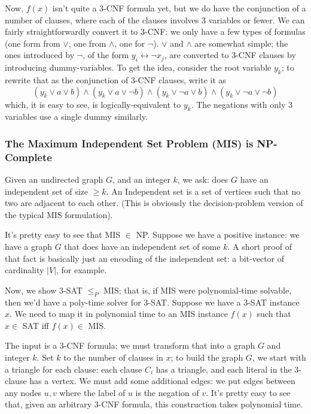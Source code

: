 \documentclass{article}
\begin{document}
Now, $f(x)$ isn't quite a 3-CNF formula yet, but we do have the conjunction of
a number of clauses, where each of the clauses involves 3 variables or
fewer. We can fairly straightforwardly convert it to 3-CNF: we only have
a few types of formulas (one form from $\vee$, one from $\wedge$, one
for $\neg$).
$\vee$ and $\wedge$ are somewhat simple; the ones introduced by $\neg$,
of the form $y_i \leftrightarrow \neg x_j$, are converted to 3-CNF clauses
by introducing dummy-variables.
To get the idea, consider the root variable $y_k$; to rewrite that as the
conjunction of 3-CNF clauses, write it as
$$
(y_k \vee a \vee b) \wedge 
(y_k \vee a \vee \neg b) \wedge
(y_k \vee \neg a \vee b) \wedge 
(y_k \vee \neg a \vee \neg b)
$$
which, it is easy to see, is logically-equivalent to $y_k$.
The negations with only 3 variables use a single dummy similarly.



\subsubsection{The Maximum Independent Set Problem (MIS) is NP-Complete}

Given an undirected graph $G$, and an integer $k$, we ask: does $G$ have
an independent set of size $\geq k$.
An Independent set is a set of vertices such that no two are adjacent to
each other.
(This is obviously the decision-problem version of the typical MIS 
formulation).

It's pretty easy to see that MIS $\in$ NP. Suppose we have a positive instance:
we have a graph $G$ that does have an independent set of some $k$. A short 
proof
of that fact is basically just an encoding of the independent set: a bit-vector
of cardinality $|V|$, for example.

Now, we show 3-SAT $\leq_P$ MIS; that is, if MIS were polynomial-time solvable,
then we'd have a poly-time solver for 3-SAT.
Suppose we have a 3-SAT instance $x$.
We need to map it in polynomial time to an MIS instance $f(x)$ such that
$x\in $ SAT iff $f(x)\in$ MIS.

The input is a 3-CNF formula; we must transform that into a graph $G$ and
integer $k$.
Set $k$ to the number of clauses in $x$; to build the graph $G$, we start
with a triangle for each clause: each clause $C_i$ has a triangle,
and each literal in the 3-clause has a vertex.
We must add some additional edges: we put edges between any nodes $u,v$ where
the label of $u$ is the negation of $v$.
It's pretty easy to see that, given an arbitrary 3-CNF formula, this 
construction
takes polynomial time.
\end{document}
